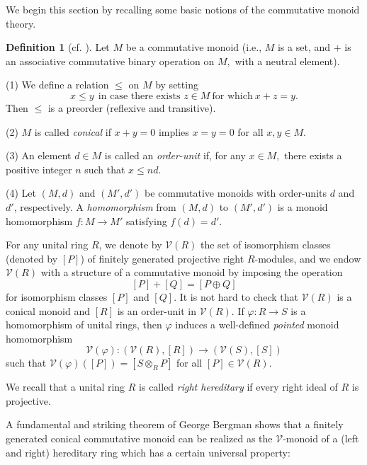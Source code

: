 \documentclass[a4paper, 11pt, reqno]{amsart}
\theoremstyle{definition}
\newtheorem{defn}[thm]{Definition}
\let\phi\varphi
\newcommand{\K}{\mathsf{k}}
\begin{document}
 
 
We begin this section by recalling some basic notions of the commutative monoid theory.

\begin{defn}[{cf. \cite[Definition 2.5]{ANP2017}}]\label{monoiddefs}
Let $M$ be a commutative monoid (i.e., $M$ is a set, and $+$ is an associative commutative binary operation on $M,$ with a neutral element).   
	
(1)  We define a relation $\leq$ on $M$ by setting
$$x\leq y \ \ \mbox{in case there exists }  z\in M  \ \mbox{for which} \ x+ z = y.$$ Then $\leq$ is a preorder (reflexive and transitive).  
	
(2) $M$ is called {\it conical} if $x + y = 0$ implies  $x=y=0$ for all $x, y\in M$.
	
(3) An element $d\in M$ is called an \emph{order-unit} if, for any $x\in M,$  there exists a positive integer $n$ such that $x\leq nd$.	

(4) Let $(M, d)$ and $(M', d')$ be commutative monoids with order-units $d$ and $d'$, respectively. A {\it homomorphism} from $(M, d)$ to $(M', d')$ is a monoid homomorphism $f: M\longrightarrow M'$ satisfying $f(d) = d'$.
\end{defn}

For any unital  ring $R$, we denote by $\mathcal{V}(R)$ the set of isomorphism classes (denoted by $[P]$) of finitely generated projective right $R$-modules, and we endow $\mathcal{V}(R)$ with a structure of a commutative monoid by imposing the operation $$[P] + [Q] = [P\oplus Q]$$ for isomorphism classes $[P]$ and $[Q]$. 
It is not hard to check that $\mathcal{V}(R)$ is a conical monoid and $[R]$ is an order-unit in $\mathcal{V}(R)$. If $\phi: R\longrightarrow S$ is a homomorphism of unital rings, then $\phi$ induces a well-defined \emph{pointed} monoid homomorphism $$\mathcal{V}(\phi): (\mathcal{V}(R), [R]) \longrightarrow (\mathcal{V}(S), [S])$$ such that $\mathcal{V}(\phi)([P]) = [S\otimes_RP]$ for all $[P]\in \mathcal{V}(R)$. 

We recall that a unital ring $R$ is called {\it right hereditary} if every right ideal of $R$ is projective.

A fundamental and striking theorem of George Bergman \cite{Berg74} shows that a finitely generated conical commutative monoid can be realized as the $\mathcal{V}$-monoid of a (left and right) hereditary ring which has a certain universal property: 
\end{document}
